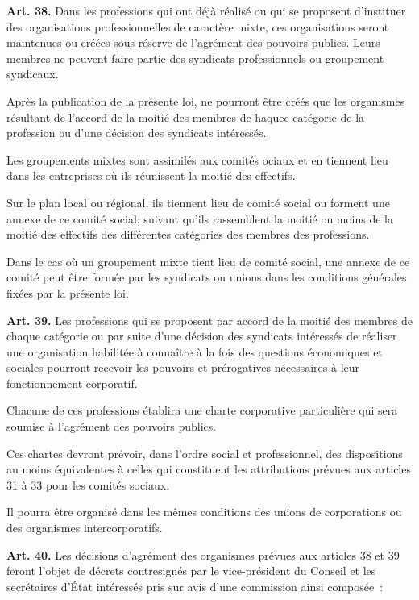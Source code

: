 \documentclass[french,twoside]{book} %
\newcommand{\labelchar}[1]{\textbf{\color{rubric} #1}}
\begin{document}
\noindent \labelchar{Art. 38.} Dans les professions qui ont déjà réalisé ou qui se proposent d’instituer des organisations professionnelles de caractère mixte, ces organisations seront maintenues ou créées sous réserve de l’agrément des pouvoirs publics. Leurs membres ne peuvent faire partie des syndicats professionnels ou groupement syndicaux.\par
Après la publication de la présente loi, ne pourront être créés que les organismes résultant de l’accord de la moitié des membres de haquec catégorie de la profession ou d’une décision des syndicats intéressés.\par
Les groupements mixtes sont assimilés aux comités ociaux et en tiennent lieu dans les entreprises où ils réunissent la moitié des effectifs.\par
Sur le plan local ou régional, ils tiennent lieu de comité social ou forment une annexe de ce comité social, suivant qu’ils rassemblent la moitié ou moins de la moitié des effectifs des différentes catégories des membres des professions.\par
Dans le cas où un groupement mixte tient lieu de comité social, une annexe de ce comité peut être formée par les syndicats ou unions dans les conditions générales fixées par la présente loi.\par
\bigbreak
\noindent \labelchar{Art. 39.} Les professions qui se proposent par accord de la moitié des membres de chaque catégorie ou par suite d’une décision des syndicats intéressés de réaliser une organisation habilitée à connaître à la fois des questions économiques et sociales pourront recevoir les pouvoirs et prérogatives nécessaires à leur fonctionnement corporatif.\par
Chacune de ces professions établira une charte corporative particulière qui sera soumise à l’agrément des pouvoirs publics.\par
Ces chartes devront prévoir, dans l’ordre social et professionnel, des dispositions au moins équivalentes à celles qui constituent les attributions prévues aux articles 31 à 33 pour les comités sociaux.\par
Il pourra être organisé dans les mêmes conditions des unions de corporations ou des organismes intercorporatifs.\par
\bigbreak
\noindent \labelchar{Art. 40.} Les décisions d’agrément des organismes prévues aux articles 38 et 39 feront l’objet de décrets contresignés par le vice-président du Conseil et les secrétaires d’État intéressés pris sur avis d’une commission ainsi composée :\par
\end{document}
